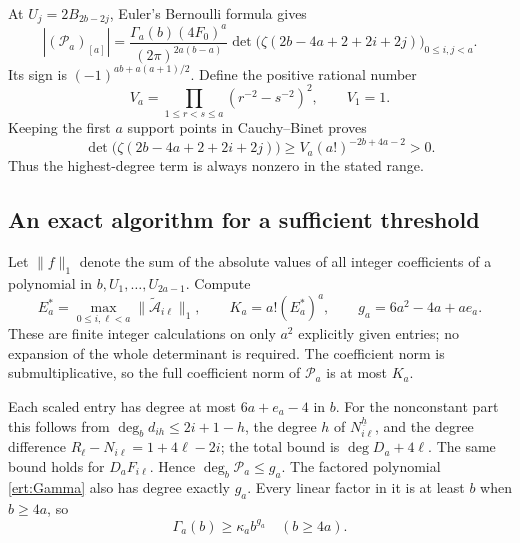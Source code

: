 At $U_j=2B_{2b-2j}$, Euler's Bernoulli formula gives
\begin{equation}\label{ert:actual-leading}
 \left|(\mathscr P_a)_{[a]}\right|
 =\frac{\Gamma_a(b)(4F_0)^a}{(2\pi)^{2a(b-a)}}
   \det\bigl(\zeta(2b-4a+2+2i+2j)\bigr)_{0\le i,j<a}.
\end{equation}
Its sign is $(-1)^{ab+a(a+1)/2}$. Define the positive rational
number
\[
 V_a=\prod_{1\le r<s\le a}(r^{-2}-s^{-2})^2,
 \qquad V_1=1.
\]
Keeping the first $a$ support points in Cauchy--Binet proves
\begin{equation}\label{ert:moment-lower}
 \det\bigl(\zeta(2b-4a+2+2i+2j)\bigr)
       \ge V_a(a!)^{-2b+4a-2}>0.
\end{equation}
Thus the highest-degree term is always nonzero in the stated range.

\subsection{An exact algorithm for a sufficient threshold}

Let $\|f\|_1$ denote the sum of the absolute values of all integer
coefficients of a polynomial in $b,U_1,\ldots,U_{2a-1}$. Compute
\[
 E_a^*=\max_{0\le i,\ell<a}\|
                  \widetilde{\mathcal A}_{i\ell}\|_1,
 \qquad K_a=a!(E_a^*)^a,
 \qquad g_a=6a^2-4a+ae_a.
\]
These are finite integer calculations on only $a^2$ explicitly given
entries; no expansion of the whole determinant is required.
The coefficient norm is submultiplicative, so the full coefficient
norm of $\mathscr P_a$ is at most $K_a$.

Each scaled entry has degree at most $6a+e_a-4$ in $b$.
For the nonconstant part this follows from
$\deg_b d_{ih}\le2i+1-h$, the degree $h$ of
$N_{i\ell}^{\underline h}$, and the degree difference
$R_\ell-N_{i\ell}=1+4\ell-2i$; the total bound is
$\deg D_a+4\ell$. The same bound holds for $D_aF_{i\ell}$.
Hence $\deg_b\mathscr P_a\le g_a$.
The factored polynomial \eqref{ert:Gamma} also has degree exactly
$g_a$. Every linear factor in it is at least $b$ when $b\ge4a$,
so
\[
 \Gamma_a(b)\ge\kappa_a b^{g_a}\quad(b\ge4a).
\]

